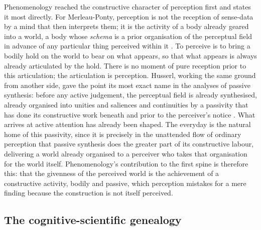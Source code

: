 Phenomenology reached the constructive character of perception first and states it most directly. For Merleau-Ponty, perception is not the reception of sense-data by a mind that then interprets them; it is the activity of a body already geared into a world, a body whose \emph{schema} is a prior organisation of the perceptual field in advance of any particular thing perceived within it \parencite{merleau-ponty1962}. To perceive is to bring a bodily hold on the world to bear on what appears, so that what appears is always already articulated by the hold. There is no moment of pure reception prior to this articulation; the articulation is perception. Husserl, working the same ground from another side, gave the point its most exact name in the analyses of passive synthesis: before any active judgement, the perceptual field is already synthesised, already organised into unities and saliences and continuities by a passivity that has done its constructive work beneath and prior to the perceiver's notice \parencite{husserl2001}. What arrives at active attention has already been shaped. The everyday is the natural home of this passivity, since it is precisely in the unattended flow of ordinary perception that passive synthesis does the greater part of its constructive labour, delivering a world already organised to a perceiver who takes that organisation for the world itself. Phenomenology's contribution to the first spine is therefore this: that the givenness of the perceived world is the achievement of a constructive activity, bodily and passive, which perception mistakes for a mere finding because the construction is not itself perceived.

\subsection{The cognitive-scientific genealogy}
\label{p23:sub:gen-cognitive}

